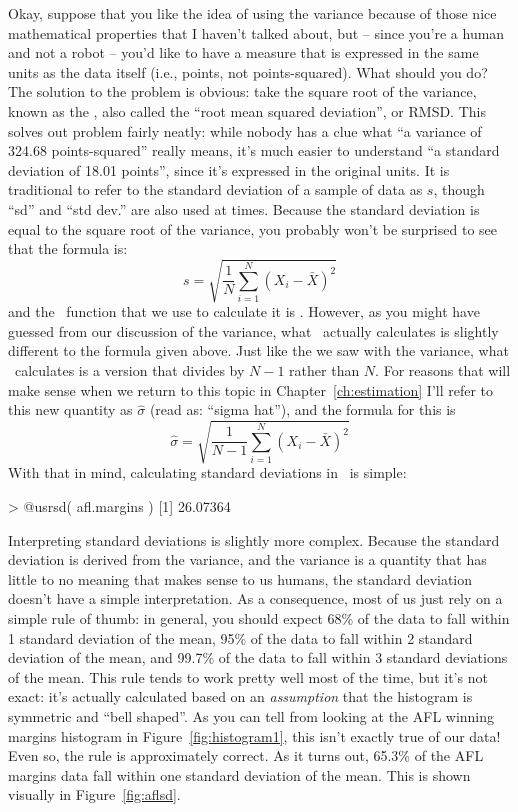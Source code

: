 Okay, suppose that you like the idea of using the variance because of those nice mathematical properties that I haven't talked about, but -- since you're a human and not a robot -- you'd like to have a measure that is expressed in the same units as the data itself (i.e., points, not points-squared). What should you do? The solution to the problem is obvious: take the square root of the variance, known as the , also called the ``root mean squared deviation'', or RMSD. This solves out problem fairly neatly: while nobody has a clue what ``a variance of 324.68 points-squared'' really means, it's much easier to understand ``a standard deviation of 18.01 points'', since it's expressed in the original units. It is traditional to refer to the standard deviation of a sample of data as $s$, though 	``sd'' and ``std dev.'' are also used at times. Because the standard deviation is equal to the square root of the variance, you probably won't be surprised to see that the formula is:
$$
s = \sqrt{ \frac{1}{N} \sum_{i=1}^N \left( X_i - \bar{X} \right)^2 }
$$
and the \R\ function that we use to calculate it is . However, as you might have guessed from our discussion of the variance, what \R\ actually calculates is slightly different to the formula given above. Just like the we saw with the variance, what \R\ calculates is a version that divides by $N-1$ rather than $N$. For reasons that will make sense when we return to this topic in Chapter~\ref{ch:estimation} I'll refer to this new quantity as $\hat\sigma$ (read as: ``sigma hat''), and the formula for this is
$$
\hat\sigma = \sqrt{ \frac{1}{N-1} \sum_{i=1}^N \left( X_i - \bar{X} \right)^2 }
$$
With that in mind, calculating standard deviations in \R\ is simple:
\begin{rblock1}
> @usr{sd( afl.margins )} 
[1] 26.07364
\end{rblock1}

Interpreting standard deviations is slightly more complex. Because the standard deviation is derived from the variance, and the variance is a quantity that has little to no meaning that makes sense to us humans, the standard deviation doesn't have a simple interpretation. As a consequence, most of us just rely on a simple rule of thumb: in general, you should expect 68\% of the data to fall within 1 standard deviation of the mean, 95\% of the data to fall within 2 standard deviation of the mean, and 99.7\% of the data to fall within 3 standard deviations of the mean. This rule tends to work pretty well most of the time, but it's not exact: it's actually calculated based on an {\it assumption} that the histogram is symmetric and ``bell shaped''. As you can tell from looking at the AFL winning margins histogram in Figure~\ref{fig:histogram1}, this isn't exactly true of our data! Even so, the rule is approximately correct. As it turns out, 65.3\% of the AFL margins data fall within one standard deviation of the mean. This is shown visually in Figure~\ref{fig:aflsd}.

